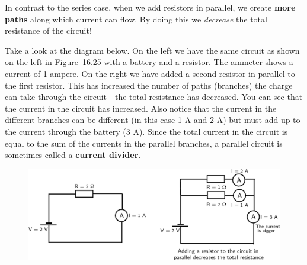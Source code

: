           
          \label{m38776*id67501}In contrast to the series case, when we add resistors in parallel, we create \textbf{more paths} along which current can flow. By doing this we \textsl{decrease} the total resistance of the circuit!\par 
          \label{m38776*id67518}Take a look at the diagram below. On the left we have the same circuit as shown on the left in Figure~16.25 with a battery and a resistor. The ammeter shows a current of 1 ampere. On the right we have added a second resistor in parallel to the first resistor. This has increased the number of paths (branches) the charge can take through the circuit - the total resistance has decreased. You can see that the current in the circuit has increased. Also notice that the current in the different branches can be different (in this case 1 A and 2 A) but must add up to the current through the battery (3 A). Since the total current in the circuit is equal to the sum of the currents in the parallel branches, a parallel circuit is sometimes called a \textbf{current divider}.\par 
          \label{m38776*id67525}
            
    \setcounter{subfigure}{0}


	\begin{figure}[H] %
    \begin{center}
    \label{m38776*id67528!!!underscore!!!media}\label{m38776*id67528!!!underscore!!!printimage}\includegraphics{col11305.imgs/m38776_PG10C9_033.png} %
        
      \vspace{2pt}
    \vspace{.1in}
    
    \end{center}

 \end{figure}   

    \addtocounter{footnote}{-0}
    
